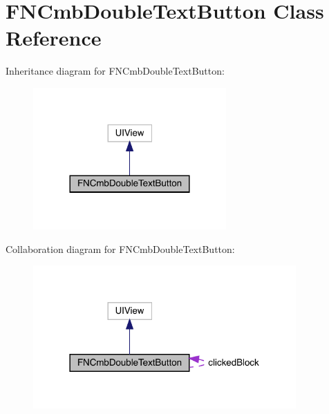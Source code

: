 \hypertarget{interface_f_n_cmb_double_text_button}{}\section{F\+N\+Cmb\+Double\+Text\+Button Class Reference}
\label{interface_f_n_cmb_double_text_button}


Inheritance diagram for F\+N\+Cmb\+Double\+Text\+Button\+:\nopagebreak
\begin{figure}[H]
\begin{center}
\leavevmode
\includegraphics[width=209pt]{interface_f_n_cmb_double_text_button__inherit__graph}
\end{center}
\end{figure}


Collaboration diagram for F\+N\+Cmb\+Double\+Text\+Button\+:\nopagebreak
\begin{figure}[H]
\begin{center}
\leavevmode
\includegraphics[width=285pt]{interface_f_n_cmb_double_text_button__coll__graph}
\end{center}
\end{figure}
